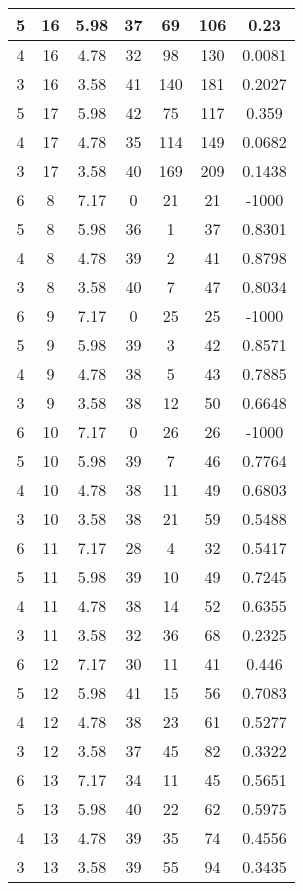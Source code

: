 \documentclass[letterpaper, 12pt]{article}
\begin{document}
\begin{longtable}{|c|c|c|c|c|c|c|}
\hline
5 & 16 & 5.98 & 37 & 69 & 106 & 0.23 \\
\hline
4 & 16 & 4.78 & 32 & 98 & 130 & 0.0081 \\
\hline
3 & 16 & 3.58 & 41 & 140 & 181 & 0.2027 \\
\hline
5 & 17 & 5.98 & 42 & 75 & 117 & 0.359 \\
\hline
4 & 17 & 4.78 & 35 & 114 & 149 & 0.0682 \\
\hline
3 & 17 & 3.58 & 40 & 169 & 209 & 0.1438 \\
\hline
6 & 8 & 7.17 & 0 & 21 & 21 & -1000 \\
\hline
5 & 8 & 5.98 & 36 & 1 & 37 & 0.8301 \\
\hline
4 & 8 & 4.78 & 39 & 2 & 41 & 0.8798 \\
\hline
3 & 8 & 3.58 & 40 & 7 & 47 & 0.8034 \\
\hline
6 & 9 & 7.17 & 0 & 25 & 25 & -1000 \\
\hline
5 & 9 & 5.98 & 39 & 3 & 42 & 0.8571 \\
\hline
4 & 9 & 4.78 & 38 & 5 & 43 & 0.7885 \\
\hline
3 & 9 & 3.58 & 38 & 12 & 50 & 0.6648 \\
\hline
6 & 10 & 7.17 & 0 & 26 & 26 & -1000 \\
\hline
5 & 10 & 5.98 & 39 & 7 & 46 & 0.7764 \\
\hline
4 & 10 & 4.78 & 38 & 11 & 49 & 0.6803 \\
\hline
3 & 10 & 3.58 & 38 & 21 & 59 & 0.5488 \\
\hline
6 & 11 & 7.17 & 28 & 4 & 32 & 0.5417 \\
\hline
5 & 11 & 5.98 & 39 & 10 & 49 & 0.7245 \\
\hline
4 & 11 & 4.78 & 38 & 14 & 52 & 0.6355 \\
\hline
3 & 11 & 3.58 & 32 & 36 & 68 & 0.2325 \\
\hline
6 & 12 & 7.17 & 30 & 11 & 41 & 0.446 \\
\hline
5 & 12 & 5.98 & 41 & 15 & 56 & 0.7083 \\
\hline
4 & 12 & 4.78 & 38 & 23 & 61 & 0.5277 \\
\hline
3 & 12 & 3.58 & 37 & 45 & 82 & 0.3322 \\
\hline
6 & 13 & 7.17 & 34 & 11 & 45 & 0.5651 \\
\hline
5 & 13 & 5.98 & 40 & 22 & 62 & 0.5975 \\
\hline
4 & 13 & 4.78 & 39 & 35 & 74 & 0.4556 \\
\hline
3 & 13 & 3.58 & 39 & 55 & 94 & 0.3435 \\

\end{longtable}
\end{document}
